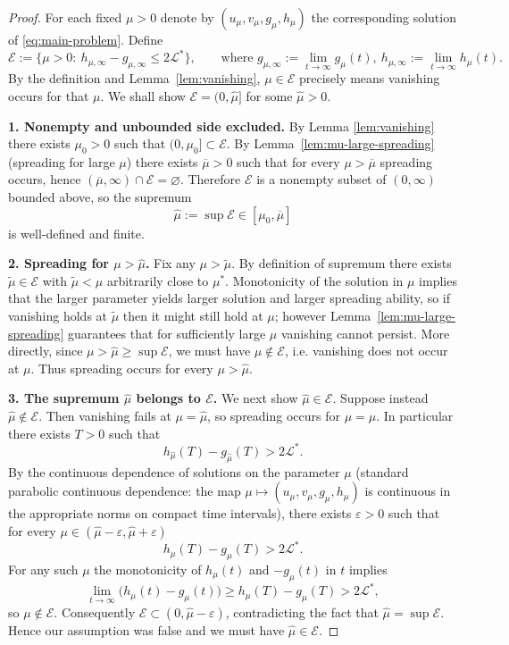 \documentclass[a4paper,11pt]{amsart}
\theoremstyle{definition}
\numberwithin{equation}{section}
\theoremstyle{definition}
\begin{document}
\begin{proof}
For each fixed \(\mu>0\) denote by \((u_\mu,v_\mu,g_\mu,h_\mu)\) the corresponding solution of \eqref{eq:main-problem}.  Define
\[
\mathcal E := \big\{\mu>0:\ h_{\mu,\infty}-g_{\mu,\infty}\leq 2\mathcal L^\ast\big\},
\qquad
\text{where }g_{\mu,\infty}:=\lim_{t\to\infty}g_\mu(t),\
h_{\mu,\infty}:=\lim_{t\to\infty}h_\mu(t).
\]
By the definition and Lemma~\eqref{lem:vanishing}, \(\mu\in\mathcal E\) precisely means vanishing occurs for that \(\mu\).  We shall show \(\mathcal E=(0,\hat{\mu}]\) for some \(\hat{\mu}>0\).

\medskip\noindent\textbf{1. Nonempty and unbounded side excluded.}
By Lemma \eqref{lem:vanishing} there exists \(\mu_0>0\) such that \((0,\mu_0]\subset\mathcal E\).  By Lemma~\eqref{lem:mu-large-spreading} (spreading for large \(\mu\)) there exists \(\overline\mu>0\) such that for every \(\mu>\overline\mu\) spreading occurs, hence \((\overline\mu,\infty)\cap\mathcal E=\varnothing\).  Therefore \(\mathcal E\) is a nonempty subset of \((0,\infty)\) bounded above, so the supremum
\[
\hat{\mu} := \sup\mathcal E \in [\mu_0,\overline\mu]
\]
is well-defined and finite.

\medskip\noindent\textbf{2. Spreading for \(\mu>\hat{\mu} \).}
Fix any \(\mu>\tilde{\mu} \). By definition of supremum there exists \(\tilde\mu\in\mathcal E\) with \(\tilde\mu<\mu\) arbitrarily close to \(\mu^\ast\). Monotonicity of the solution in \(\mu\)  implies that the larger parameter yields larger solution and larger spreading ability, so if vanishing holds at \(\tilde\mu\) then it might still hold at \(\mu\); however Lemma~\eqref{lem:mu-large-spreading} guarantees that for sufficiently large \(\mu\) vanishing cannot persist. More directly, since \(\mu>\hat\mu\geq\sup\mathcal E\), we must have \(\mu\not\in\mathcal E\), i.e. vanishing does not occur at \(\mu\). Thus spreading occurs for every \(\mu>\hat\mu\).

\medskip\noindent\textbf{3. The supremum \(\hat\mu\) belongs to \(\mathcal E\).}
We next show \(\hat\mu\in\mathcal E\). Suppose instead \(\hat\mu\notin\mathcal E\). Then vanishing fails at \(\mu=\hat\mu\), so spreading occurs for \(\mu=\hat\mu\). In particular there exists \(T>0\) such that
\[
h_{\hat\mu}(T)-g_{\hat\mu}(T) > 2\mathcal L^\ast.
\]
By the continuous dependence of solutions on the parameter \(\mu\) (standard parabolic continuous dependence: the map \(\mu\mapsto (u_\mu,v_\mu,g_\mu,h_\mu)\) is continuous in the appropriate norms on compact time intervals), there exists \(\varepsilon>0\) such that for every \(\mu\in(\hat\mu-\varepsilon,\hat\mu+\varepsilon)\)
\[
h_{\mu}(T)-g_{\mu}(T) > 2\mathcal L^\ast.
\]
For any such \(\mu\) the monotonicity of \(h_\mu(t)\) and \(-g_\mu(t)\) in \(t\) implies
\[
\lim_{t\to\infty}\big(h_\mu(t)-g_\mu(t)\big) \geq h_\mu(T)-g_\mu(T) > 2\mathcal L^\ast,
\]
so \(\mu\notin\mathcal E\). Consequently \(\mathcal E\subset(0,\hat\mu-\varepsilon)\), contradicting the fact that \(\hat\mu=\sup\mathcal E\). Hence our assumption was false and we must have \(\hat\mu\in\mathcal E\).


\end{proof}
\end{document}
